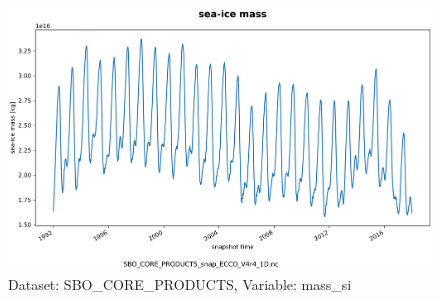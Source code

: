 \begin{figure}[H]
\centering
\includegraphics[scale=0.55]{../images/plots/oneD_plots/SBO_Core_Products/mass_si.png}
\caption{Dataset: SBO\_CORE\_PRODUCTS, Variable: mass\_si}
\label{tab:table-SBO_CORE_PRODUCTS_mass_si-Plot}
\end{figure}
\pagebreak
